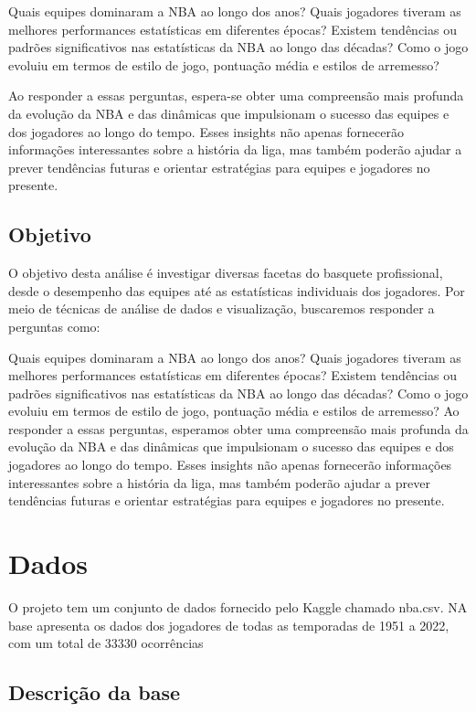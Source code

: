 \documentclass[
]{book}
\begin{document}
Quais equipes dominaram a NBA ao longo dos anos?
Quais jogadores tiveram as melhores performances estatísticas em diferentes épocas?
Existem tendências ou padrões significativos nas estatísticas da NBA ao longo das décadas?
Como o jogo evoluiu em termos de estilo de jogo, pontuação média e estilos de arremesso?

Ao responder a essas perguntas, espera-se obter uma compreensão mais profunda da evolução da NBA e das dinâmicas que impulsionam o sucesso das equipes e dos jogadores ao longo do tempo. Esses insights não apenas fornecerão informações interessantes sobre a história da liga, mas também poderão ajudar a prever tendências futuras e orientar estratégias para equipes e jogadores no presente.

\hypertarget{objetivo}{%
\section{Objetivo}\label{objetivo}}

O objetivo desta análise é investigar diversas facetas do basquete profissional, desde o desempenho das equipes até as estatísticas individuais dos jogadores. Por meio de técnicas de análise de dados e visualização, buscaremos responder a perguntas como:

Quais equipes dominaram a NBA ao longo dos anos? Quais jogadores tiveram as melhores performances estatísticas em diferentes épocas? Existem tendências ou padrões significativos nas estatísticas da NBA ao longo das décadas? Como o jogo evoluiu em termos de estilo de jogo, pontuação média e estilos de arremesso? Ao responder a essas perguntas, esperamos obter uma compreensão mais profunda da evolução da NBA e das dinâmicas que impulsionam o sucesso das equipes e dos jogadores ao longo do tempo. Esses insights não apenas fornecerão informações interessantes sobre a história da liga, mas também poderão ajudar a prever tendências futuras e orientar estratégias para equipes e jogadores no presente.

\hypertarget{dados}{%
\chapter{Dados}\label{dados}}

O projeto tem um conjunto de dados fornecido pelo Kaggle chamado nba.csv. NA base apresenta os dados dos jogadores de todas as temporadas de 1951 a 2022, com um total de 33330 ocorrências

\hypertarget{descriuxe7uxe3o-da-base}{%
\section{Descrição da base}\label{descriuxe7uxe3o-da-base}}
\end{document}
